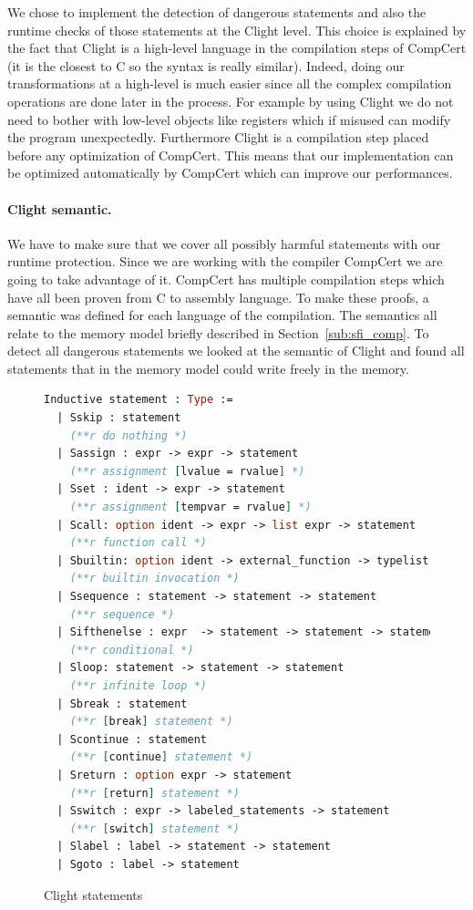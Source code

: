 \documentclass[11pt]{sdm}
\begin{document}
We chose to implement the detection of dangerous statements and also the runtime checks of those statements at the Clight level.
This choice is explained by the fact that Clight is a high-level language in the compilation steps of CompCert (it is the closest to C so the syntax is really similar).
Indeed, doing our transformations at a high-level is much easier since all the complex compilation operations are done later in the process.
For example by using Clight we do not need to bother with low-level objects like registers which if misused can modify the program unexpectedly.
Furthermore Clight is a compilation step placed before any optimization of CompCert.
This means that our implementation can be optimized automatically by CompCert which can improve our performances.

\paragraph{Clight semantic.}
\label{par:Clight semantic}

We have to make sure that we cover all possibly harmful statements with our runtime protection.
Since we are working with the compiler CompCert we are going to take advantage of it.
CompCert has multiple compilation steps which have all been proven from C to assembly language.
To make these proofs, a semantic was defined for each language of the compilation. The semantics all relate to the memory model briefly described in Section~\ref{sub:sfi_comp}.
To detect all dangerous statements we looked at the semantic of Clight and found all statements that in the memory model could write freely in the memory.\\

\begin{figure}[!ht]
\centering
\begin{lstlisting}[language=Caml]
Inductive statement : Type :=
  | Sskip : statement
    (**r do nothing *)
  | Sassign : expr -> expr -> statement
    (**r assignment [lvalue = rvalue] *)
  | Sset : ident -> expr -> statement 
    (**r assignment [tempvar = rvalue] *)
  | Scall: option ident -> expr -> list expr -> statement
    (**r function call *)
  | Sbuiltin: option ident -> external_function -> typelist -> list expr -> statement
    (**r builtin invocation *)
  | Ssequence : statement -> statement -> statement 
    (**r sequence *)
  | Sifthenelse : expr  -> statement -> statement -> statement
    (**r conditional *)
  | Sloop: statement -> statement -> statement 
    (**r infinite loop *)
  | Sbreak : statement   
    (**r [break] statement *)
  | Scontinue : statement
    (**r [continue] statement *)
  | Sreturn : option expr -> statement 
    (**r [return] statement *)
  | Sswitch : expr -> labeled_statements -> statement
    (**r [switch] statement *)
  | Slabel : label -> statement -> statement
  | Sgoto : label -> statement
\end{lstlisting}
\caption{Clight statements}
\label{clight_statements}
\end{figure}
\end{document}
